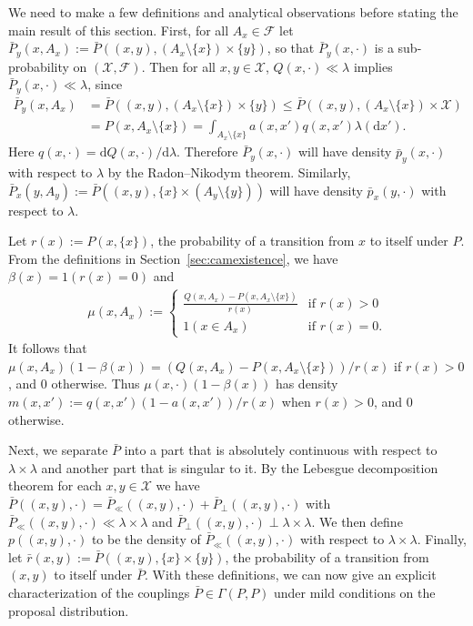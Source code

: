 \documentclass[aihp]{imsart}
\theoremstyle{plain}
\theoremstyle{remark}
\theoremstyle{definition} \newtheorem{example}{Example}
\newcommand{\eq}[1]{\begin{align*}#1\end{align*}} %
\newcommand{\scrF}{\mathscr{F}}
\newcommand{\calX}{\mathcal{X}}
\newcommand{\diff}{\mathrm{d} } %
\newcommand{\bp}{\bar P}
\newcommand{\sm}{\setminus}
\newcommand{\sx}{\{ x \}}
\newcommand{\sy}{\{ y \}}
\newcommand{\xy}{(x,y)}
\begin{document}
We need to make a few definitions and analytical observations before stating the main result of this
section. First, for all $A_x \in \scrF$ let ${\bp_y(x, A_x)} := {\bp(\xy, (A_x \sm \sx) \times
	\sy)}$, so that $\bp_y(x, \cdot)$ is a sub-probability on $(\calX, \scrF)$. Then for all $x, y \in
\calX$, ${Q(x, \cdot) \ll \lambda}$ implies ${\bp_y(x, \cdot) \ll \lambda}$, since \eq{ \bp_y(x,
	A_x) & = \bp(\xy, (A_x \sm \sx) \times \sy) \leq \bp(\xy, (A_x \sm \sx) \times \calX) \\ & = P(x,
	A_x \sm \sx) = \int_{A_x \sm \sx} a(x,x') q(x,x') \lambda(\diff x'). } Here $q(x,\cdot) = \diff
Q(x,\cdot) / \diff \lambda$. Therefore $\bp_y(x, \cdot)$ will have density $\bar p_y(x, \cdot)$ with
respect to $\lambda$ by the Radon--Nikodym theorem. Similarly, $\bp_x(y, A_y) := \bp(\xy, \sx \times
(A_y \sm \sy))$ will have density $\bar p_x(y, \cdot)$ with respect to $\lambda$.

Let $r(x) := P(x, \sx)$, the probability of a transition from $x$ to itself under $P$. From the
definitions in Section~\ref{sec:camexistence}, we have $\beta(x) = 1(r(x) = 0)$ and
\eq{
	\mu(x, A_x) := \begin{cases}
		\frac{ Q(x, A_x) - P(x, A_x \sm \sx) } {r(x)} & \mbox{if } r(x) > 0 \\
		1(x \in A_x) & \mbox{if } r(x) = 0.
	\end{cases}
}
It follows that $\mu(x, A_x) (1 - \beta(x)) = (Q(x, A_x) - P(x, A_x \sm \sx))/r(x)$ if $r(x) >0$,
and 0 otherwise. Thus ${\mu(x, \cdot) (1 - \beta(x))}$ has density $m(x,x') := q(x,x')
(1-a(x,x'))/r(x)$ when $r(x) > 0$, and 0 otherwise.

Next, we separate $\bp$ into a part that is absolutely continuous with respect to $\lambda \times
\lambda$ and another part that is singular to it. By the Lebesgue decomposition theorem
\citep[e.g.][chapter 5.5]{Dudley2002} for each $x, y \in \calX$ we have ${\bp(\xy, \cdot)} =
{\bp_\ll(\xy, \cdot) + \bp_\perp(\xy, \cdot)}$ with $\bp_\ll(\xy, \cdot) \ll \lambda \times \lambda$
and $\bp_\perp(\xy, \cdot) \perp \lambda \times \lambda$. We then define $p(\xy, \cdot)$ to be the
density of $\bp_\ll(\xy, \cdot)$ with respect to $\lambda \times \lambda$. Finally, let $\bar r(x,y)
:= \bp(\xy, \sx \times \sy)$, the probability of a transition from $\xy$ to itself under $\bp$. With
these definitions, we can now give an explicit characterization of the couplings $\bp \in
\Gamma(P,P)$ under mild conditions on the proposal distribution.

\smallskip
\end{document}
